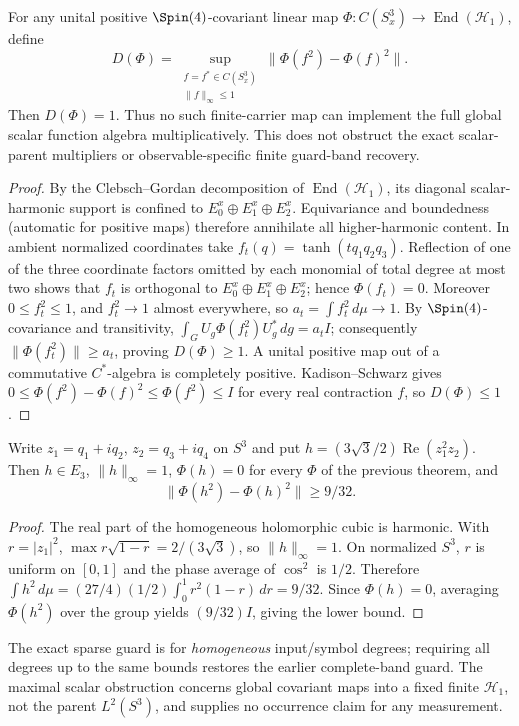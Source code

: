 \documentclass[12pt,a4paper]{article}
\begin{document}
\begin{theorem}
\label{p2c:thm:v270-maximal-covariant-multiplication-defect}
For any unital positive $\Spin(4)$-covariant linear map
$\Phi:C(S^3_x)\to\operatorname{End}(\mathcal H_1)$, define
\[
D(\Phi)=\sup_{\substack{f=f^*\in C(S^3_x)\\\|f\|_\infty\le1}}
 \|\Phi(f^2)-\Phi(f)^2\|.
\]
Then $\boxed{D(\Phi)=1}$.  Thus no such finite-carrier map can
implement the full global scalar function algebra multiplicatively.
This does not obstruct the exact scalar-parent multipliers or
observable-specific finite guard-band recovery.
\end{theorem}
\begin{proof}
By the Clebsch--Gordan decomposition of
$\operatorname{End}(\mathcal H_1)$, its diagonal scalar-harmonic
support is confined to $E_0^x\oplus E_1^x\oplus E_2^x$.
Equivariance and boundedness (automatic for positive maps) therefore
annihilate all higher-harmonic content. In ambient normalized
coordinates take $f_t(q)=\tanh(tq_1q_2q_3)$.
Reflection of one of the three coordinate factors omitted by each
monomial of total degree at most two shows that $f_t$ is orthogonal
to $E_0^x\oplus E_1^x\oplus E_2^x$; hence $\Phi(f_t)=0$.
Moreover $0\le f_t^2\le1$, and $f_t^2\to1$ almost everywhere, so
$a_t=\int f_t^2\,d\mu\to1$.
By $\Spin(4)$-covariance and transitivity,
$\int_G U_g\Phi(f_t^2)U_g^*\,dg=a_tI$;
consequently $\|\Phi(f_t^2)\|\ge a_t$, proving $D(\Phi)\ge1$.
A unital positive map out of a commutative $C^*$-algebra is completely
positive. Kadison--Schwarz gives
$0\le\Phi(f^2)-\Phi(f)^2\le\Phi(f^2)\le I$
for every real contraction $f$, so $D(\Phi)\le1$.
\end{proof}
\begin{proposition}
\label{p2c:prop:v270-cubic-defect-witness}
Write $z_1=q_1+iq_2$, $z_2=q_3+iq_4$ on $S^3$ and put
$h=(3\sqrt3/2)\operatorname{Re}(z_1^2z_2)$.
Then $h\in E_3$, $\|h\|_\infty=1$, $\Phi(h)=0$ for every
$\Phi$ of the previous theorem, and
\[
\boxed{\|\Phi(h^2)-\Phi(h)^2\|\ge 9/32.}
\]
\end{proposition}
\begin{proof}
The real part of the homogeneous holomorphic cubic is harmonic.
With $r=|z_1|^2$, $\max r\sqrt{1-r}=2/(3\sqrt3)$, so
$\|h\|_\infty=1$. On normalized $S^3$, $r$ is uniform on $[0,1]$
and the phase average of $\cos^2$ is $1/2$. Therefore
$\int h^2\,d\mu=(27/4)(1/2)\int_0^1r^2(1-r)\,dr=9/32$.
Since $\Phi(h)=0$, averaging $\Phi(h^2)$ over the group yields
$(9/32)I$, giving the lower bound.
\end{proof}
\begin{remark}
\label{p2c:rem:v270-local-global-scope}
The exact sparse guard is for \emph{homogeneous} input/symbol degrees;
requiring all degrees up to the same bounds restores the earlier
complete-band guard. The maximal scalar obstruction concerns global
covariant maps into a fixed finite $\mathcal H_1$, not the parent
$L^2(S^3)$, and supplies no occurrence claim for any measurement.
\end{remark}
\end{document}
